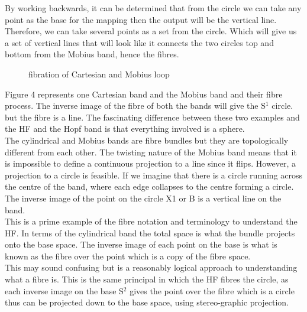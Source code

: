 \documentclass[12pt]{article} %
\begin{document}
\begin{flushleft}
By working backwards, it can be determined that from the circle we can take any point as the base for the mapping then the output will be the vertical line. Therefore, we can take several points as a set from the circle. Which will give us a set of vertical lines that will look like it connects the two circles top and bottom from the Mobius band, hence the fibres. \\


\begin{figure}[H] %
\caption{fibration of Cartesian and Mobius loop \cite{Ken:q}}
\label{fig:speciation}
\end{figure}

Figure 4 represents one Cartesian band and the Mobius band and their fibre process. The inverse image of the fibre of both the bands will give the S$^{1}$ circle. but the fibre is a line. The fascinating difference between these two examples and the HF and the Hopf band is that everything involved is a sphere.\\

The cylindrical and Mobius bands are fibre bundles but they are topologically different from each other. The twisting nature of the Mobius band means that it is impossible to define a continuous projection to a line since it flips. However, a projection to a circle is feasible. If we imagine that there is a circle running across the centre of the band, where each edge collapses to the centre forming a circle. The inverse image of the point on the circle X1 or B is a vertical line on the band.\\

This is a prime example of the fibre notation and terminology to understand the HF. In terms of the cylindrical band the total space is what the bundle projects onto the base space. The inverse image of each point on the base is what is known as the fibre over the point which is a copy of the fibre space.\\

This may sound confusing but is a reasonably logical approach to understanding what a fibre is. This is the same principal in which the HF fibres the circle, as each inverse image on the base S$^{2}$ gives the point over the fibre which is a circle thus can be projected down to the base space, using stereo-graphic projection.\\


\end{flushleft}
\end{document}
